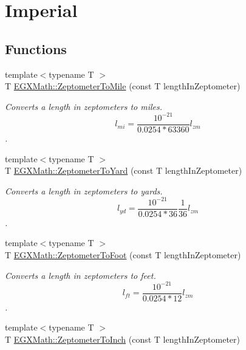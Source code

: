 \hypertarget{group___e_g_x_math-_conversions-_length_conversions-_s_i-_zeptometer-_imperial}{}\section{Imperial}
\label{group___e_g_x_math-_conversions-_length_conversions-_s_i-_zeptometer-_imperial}
\subsection*{Functions}
\begin{DoxyCompactItemize}
\item 
{\footnotesize template$<$typename T $>$ }\\T \mbox{\hyperlink{group___e_g_x_math-_conversions-_length_conversions-_s_i-_zeptometer-_imperial_ga2cd73cc7564758f2bf88f1a6e9269aff}{E\+G\+X\+Math\+::\+Zeptometer\+To\+Mile}} (const T length\+In\+Zeptometer)
\begin{DoxyCompactList}\small\item\em Converts a length in zeptometers to miles. \[ l_{mi}=\frac{10^{-21}}{0.0254 * 63360} l_{zm} \]. \end{DoxyCompactList}\item 
{\footnotesize template$<$typename T $>$ }\\T \mbox{\hyperlink{group___e_g_x_math-_conversions-_length_conversions-_s_i-_zeptometer-_imperial_ga91e05169db4f6ae477da7428ff5a42b8}{E\+G\+X\+Math\+::\+Zeptometer\+To\+Yard}} (const T length\+In\+Zeptometer)
\begin{DoxyCompactList}\small\item\em Converts a length in zeptometers to yards. \[ l_{yd}= \frac{10^{-21}}{0.0254 * 36} \frac{1}{36} l_{zm} \]. \end{DoxyCompactList}\item 
{\footnotesize template$<$typename T $>$ }\\T \mbox{\hyperlink{group___e_g_x_math-_conversions-_length_conversions-_s_i-_zeptometer-_imperial_ga2567dcbdc1b08aa9c9e99082ad9fe92b}{E\+G\+X\+Math\+::\+Zeptometer\+To\+Foot}} (const T length\+In\+Zeptometer)
\begin{DoxyCompactList}\small\item\em Converts a length in zeptometers to feet. \[ l_{ft}= \frac{10^{-21}}{0.0254 * 12} l_{zm} \]. \end{DoxyCompactList}\item 
{\footnotesize template$<$typename T $>$ }\\T \mbox{\hyperlink{group___e_g_x_math-_conversions-_length_conversions-_s_i-_zeptometer-_imperial_ga6bd6b3ee6932c6aa40442a9bff2580cb}{E\+G\+X\+Math\+::\+Zeptometer\+To\+Inch}} (const T length\+In\+Zeptometer)

\end{DoxyCompactItemize}
